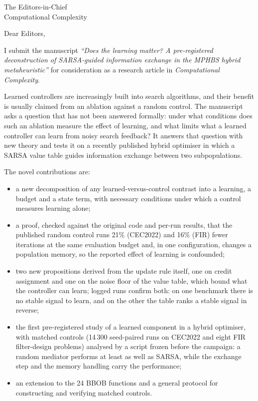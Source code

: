 \documentclass[11pt]{letter}
\date{\today}
\begin{document}
\begin{letter}{The Editors-in-Chief\\Computational Complexity}

\opening{Dear Editors,}

I submit the manuscript \emph{``Does the learning matter? A pre-registered deconstruction of SARSA-guided information
exchange in the MPHBS hybrid metaheuristic''} for consideration as a research article in \emph{Computational
Complexity}.

Learned controllers are increasingly built into search algorithms, and their benefit is usually claimed from an
ablation against a random control. The manuscript asks a question that has not been answered formally: under what
conditions does such an ablation measure the effect of learning, and what limits what a learned controller can learn
from noisy search feedback? It answers that question with new theory and tests it on a recently published hybrid
optimiser in which a SARSA value table guides information exchange between two subpopulations.

The novel contributions are:
\begin{itemize}
\item a new decomposition of any learned-versus-control contrast into a learning, a budget and a state term, with
  necessary conditions under which a control measures learning alone;
\item a proof, checked against the original code and per-run results, that the published random control runs 21\%
  (CEC2022) and 16\% (FIR) fewer iterations at the same evaluation budget and, in one configuration, changes a
  population memory, so the reported effect of learning is confounded;
\item two new propositions derived from the update rule itself, one on credit assignment and one on the noise floor of
  the value table, which bound what the controller can learn; logged runs confirm both: on one benchmark there is no
  stable signal to learn, and on the other the table ranks a stable signal in reverse;
\item the first pre-registered study of a learned component in a hybrid optimiser, with matched controls (14\,300
  seed-paired runs on CEC2022 and eight FIR filter-design problems) analysed by a script frozen before the campaign: a
  random mediator performs at least as well as SARSA, while the exchange step and the memory handling carry the
  performance;
\item an extension to the 24 BBOB functions and a general protocol for constructing and verifying matched controls.
\end{itemize}


\end{letter}
\end{document}
